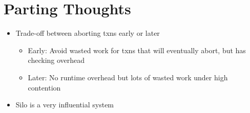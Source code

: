 \documentclass[11pt]{article}
\begin{document}
\section{Parting Thoughts}
\begin{itemize}
    \item Trade-off between aborting txns early or later
    \begin{itemize}
        \item Early: Avoid wasted work for txns that will eventually abort, but has checking overhead
        \item Later: No runtime overhead but lots of wasted work under high contention
    \end{itemize}
    \item Silo is a very influential system
\end{itemize}

\newpage


\end{document}

